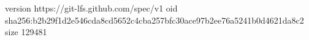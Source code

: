 version https://git-lfs.github.com/spec/v1
oid sha256:b2b29f1d2e546cda8cd5652c4cba257bfc30ace97b2ee76a5241b0d4621da8c2
size 129481
